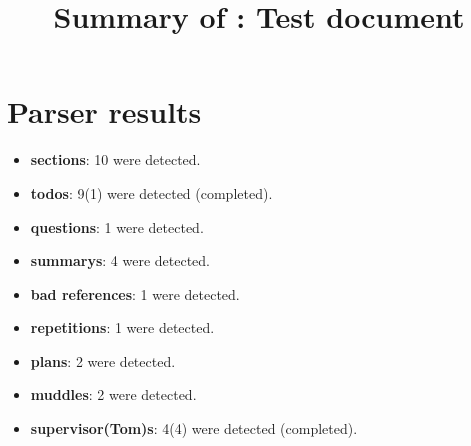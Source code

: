 \title{Summary of : Test document}
\maketitle

\section{Parser results}
    \begin{itemize}[noitemsep]
\item \textbf{sections}: 10 were detected.
\item \textbf{todos}: 9(1) were detected (completed).
\item \textbf{questions}: 1 were detected.
\item \textbf{summarys}: 4 were detected.
\item \textbf{bad references}: 1 were detected.
\item \textbf{repetitions}: 1 were detected.
\item \textbf{plans}: 2 were detected.
\item \textbf{muddles}: 2 were detected.
\item \textbf{supervisor(Tom)s}: 4(4) were detected (completed).
    \end{itemize}

